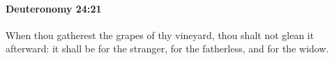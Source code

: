 
		\paragraph{Deuteronomy 24:21} %
			\label{DEUTERONOMY-24-21}

			When thou gatherest the grapes of thy vineyard, thou shalt not glean it afterward: it shall be for the stranger, for the fatherless, and for the widow.


